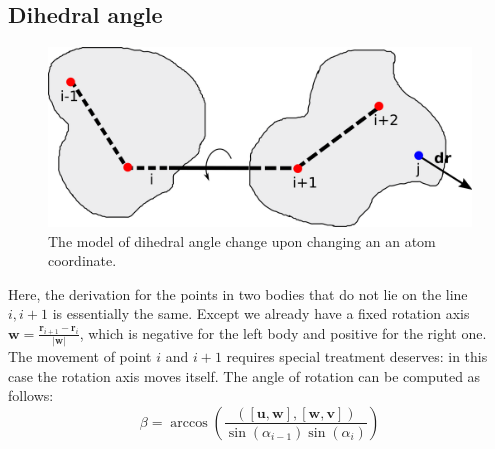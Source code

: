 \subsection{Dihedral angle}

\begin{figure}[H]
    \centering
    \includegraphics[width=\linewidth]{Fig/DihedralKinematics.png}
    \caption{The model of dihedral angle change upon changing an an atom coordinate.}
    \label{Fig:DihedralKinematics}
\end{figure}

Here, the derivation for the points in two bodies that do not lie on the line $i, i+1$ is essentially the same. Except
we already have a fixed rotation axis $\mathbf{w} = \frac{\mathbf{r}_{i+1} - \mathbf{r}_i}{|\mathbf{w}|}$, which is 
negative for the left body and positive for the right one.
The movement of point $i$ and $i+1$ requires special treatment deserves: in this case the rotation axis moves itself.
The angle of rotation can be computed as follows:
$$
\beta = \arccos \left( \frac{ \left([\mathbf{u}, \mathbf{w}], [\mathbf{w}, \mathbf{v}] \right) }{\sin(\alpha_{i-1}) \sin(\alpha_{i})} \right)
$$


